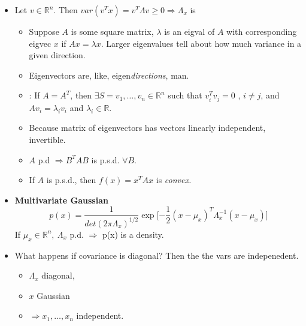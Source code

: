 \documentclass[12pt]{article}
\begin{document}
\begin{itemize}[$\Rightarrow$]
	\item Let $v \in \mathbb{R}^n$. Then $var(v^T x) = v^T \Lambda v \ge 0 \Rightarrow \Lambda_x$ is 
	\begin{itemize}
		\item Suppose $A$ is some square matrix, $\lambda$ is an eigval of $A$ with corresponding eigvec $x$ if $Ax = \lambda x$. Larger eigenvalues tell about how much variance in a given direction.
		\item Eigenvectors are, like, eigen\textit{directions}, man.
		\item {}: If $A = A^T$, then $\exists S = v_1, \ldots, v_n \in  \mathbb{R}^n$ such that $v_i^T v_j = 0$ , $i \ne j$, and $A v_i = \lambda_i v_i$ and $\lambda_i \in \mathbb{R}$.
		\item Because matrix of eigenvectors has vectors linearly independent, invertible.
		\item $A$ p.d $\Rightarrow B^T A B$ is p.s.d. $\forall B$.
		\item If $A$ is p.s.d., then $f(x) = x^T A x$ is \textit{convex.}
	\end{itemize}

	\item \textbf{Multivariate Gaussian}
	\begin{equation}
	p(x) = \frac{1}{det(2 \pi \Lambda_x)^{1/2}}\exp\big[ {-\frac{1}{2}(x - \mu_x)^T\Lambda_x^{-1} (x - \mu_x)} \big]
	\end{equation}
	If $\mu_x \in \mathbb{R}^n,~\Lambda_x $ p.d. $\Rightarrow$ p(x) is a density.

	\item What happens if covariance is diagonal? Then the the vars are indepenedent.
	\begin{itemize}
		\item $\Lambda_x$ diagonal,
		\item $x$ Gaussian
		\item $\Rightarrow x_1, \ldots, x_n$ independent.
	\end{itemize}
\end{itemize}
\end{document}

